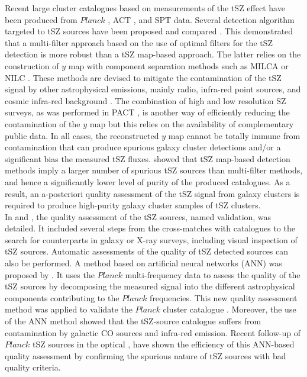 \documentclass[traditabstract,a4,twocolumn]{aa}
\begin{document}
Recent large cluster catalogues based on measurements of the tSZ effect have been produced from {\it $Planck$} \citep{planckESZ,planckPSZ}, ACT \citep{mar11,act18}, and SPT \citep{ble14} data. Several
detection algorithm targeted to tSZ sources \citep[see e.g.,][]{mel06,car09} have been
proposed and compared \citep{mel12}. 
This demonstrated that a
multi-filter approach based on the use of optimal filters for the tSZ detection is more robust than a
tSZ map-based approach. The latter relies on the construction of $y$ map with component separation methods such as MILCA \citep{hur13} or NILC \citep{rem11}. These methods are devised to mitigate the contamination of the tSZ signal by
other astrophysical emissions, mainly radio, infra-red point sources, and cosmic infra-red background
\citep{dun11,shi11,rei12,sie13,planckSZS}. The combination of high and low resolution SZ surveys, as was performed in PACT \citep{pact}, is another way of efficiently reducing the contamination of the $y$ map but this relies on the availability of complementary public data. In all cases, the reconstructed $y$ map cannot be totally immune from contamination that can produce spurious galaxy cluster detections and/or a significant bias the measured tSZ fluxes. \cite{mel12} showed that tSZ map-based detection methods imply a larger number of spurious tSZ sources than multi-filter methods, and hence a significantly lower level of purity of the produced catalogues. As a result, an a-posteriori quality assessment of the tSZ signal from galaxy clusters is required to produce high-purity galaxy cluster samples of tSZ clusters.\\
In \citet{planckPSZ} and \citet{PSZ2}, the quality assessment of the tSZ sources, named validation, was detailed. It included several steps from the cross-matches with catalogues to the search for counterparts in galaxy or X-ray surveys, including visual inspection of tSZ sources. Automatic assessments of the quality of tSZ detected sources can also be performed. A method based on artificial neural networks (ANN) was proposed by \cite{agh14}. It uses the {\it $Planck$} multi-frequency data to assess the quality of the tSZ sources by decomposing the measured signal into the different astrophysical components contributing to the {\it $Planck$} frequencies. This new quality assessment method was applied to validate the {\it $Planck$} cluster catalogue \citep{PSZ2}. Moreover, the use of the ANN method showed that the tSZ-source catalogue \citep{planckPSZ} suffers from contamination by galactic CO sources and infra-red emission. Recent follow-up of $Planck$ tSZ sources in the optical \citep{van16}, have shown the efficiency of this ANN-based quality assessment by confirming the spurious nature of tSZ sources with bad quality criteria.
\\
\end{document}
